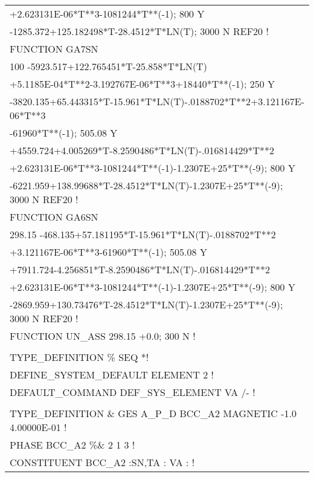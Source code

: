 \begin{longtable}[H]{ l l l }
	\multicolumn{3}{l}{+2.623131E-06*T**3-1081244*T**(-1); 800 Y}\\
	\multicolumn{3}{l}{-1285.372+125.182498*T-28.4512*T*LN(T); 3000 N REF20 !}\\
	FUNCTION GA7SN & & \\
	\multicolumn{3}{l}{100 -5923.517+122.765451*T-25.858*T*LN(T)}\\
	\multicolumn{3}{l}{+5.1185E-04*T**2-3.192767E-06*T**3+18440*T**(-1); 250 Y}\\
	\multicolumn{3}{l}{-3820.135+65.443315*T-15.961*T*LN(T)-.0188702*T**2+3.121167E-06*T**3}\\
	\multicolumn{3}{l}{-61960*T**(-1); 505.08 Y}\\
	\multicolumn{3}{l}{+4559.724+4.005269*T-8.2590486*T*LN(T)-.016814429*T**2}\\
	\multicolumn{3}{l}{+2.623131E-06*T**3-1081244*T**(-1)-1.2307E+25*T**(-9); 800 Y}\\
	\multicolumn{3}{l}{-6221.959+138.99688*T-28.4512*T*LN(T)-1.2307E+25*T**(-9); 3000 N REF20 !}\\
	FUNCTION GA6SN & & \\
	\multicolumn{3}{l}{298.15 -468.135+57.181195*T-15.961*T*LN(T)-.0188702*T**2}\\
	\multicolumn{3}{l}{+3.121167E-06*T**3-61960*T**(-1); 505.08 Y}\\
	\multicolumn{3}{l}{+7911.724-4.256851*T-8.2590486*T*LN(T)-.016814429*T**2}\\
	\multicolumn{3}{l}{+2.623131E-06*T**3-1081244*T**(-1)-1.2307E+25*T**(-9); 800 Y}\\
	\multicolumn{3}{l}{-2869.959+130.73476*T-28.4512*T*LN(T)-1.2307E+25*T**(-9); 3000 N REF20 !}\\
	\multicolumn{3}{l}{FUNCTION UN\_ASS    298.15 +0.0; 300 N !}\\
	& & \\
	\multicolumn{3}{l}{TYPE\_DEFINITION \% SEQ *!}\\
	\multicolumn{3}{l}{DEFINE\_SYSTEM\_DEFAULT ELEMENT 2 !}\\
	\multicolumn{3}{l}{DEFAULT\_COMMAND DEF\_SYS\_ELEMENT VA /- !}\\
	& & \\
	\multicolumn{3}{l}{TYPE\_DEFINITION $\&$ GES A\_P\_D BCC\_A2 MAGNETIC  -1.0    4.00000E-01 !}\\
	\multicolumn{3}{l}{PHASE BCC\_A2  \%$\&$  2 1   3 !}\\
	\multicolumn{3}{l}{CONSTITUENT BCC\_A2  :SN,TA : VA :  !}\\

\end{longtable}
